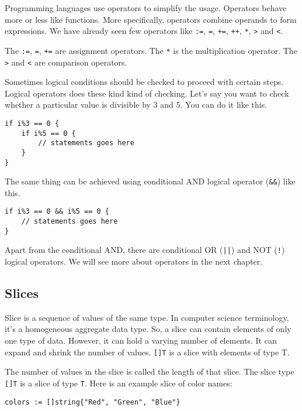 Programming languages use operators to simplify the
usage.  Operators behave more or less like functions.  More
specifically, operators combine operands to form expressions.  We have
already seen few operators
like \texttt{:=}, \texttt{=}, \texttt{+=}, \texttt{++}, \texttt{*},
\texttt{>} and \texttt{<}.

The \texttt{:=}, \texttt{=}, \texttt{+=} are assignment operators.
The \texttt{*} is the multiplication operator.  The \texttt{>}
and \texttt{<} are comparison operators.

Sometimes logical conditions should be checked to proceed with certain
steps.  Logical operators does these kind kind of checking.  Let's
say you want to check whether a particular value is divisible by 3
and 5.  You can do it like this.

\begin{lstlisting}[numbers=none]
if i%3 == 0 {
    if i%5 == 0 {
        // statements goes here
    }
}
\end{lstlisting}

The same thing can be achieved using conditional AND logical operator
(\texttt{\&\&}) like this.

\begin{lstlisting}[numbers=none]
if i%3 == 0 && i%5 == 0 {
    // statements goes here
}
\end{lstlisting}

Apart from the conditional AND, there are conditional OR (\texttt{||})
and NOT (\texttt{!}) logical operators.  We will see more about
operators in the next chapter.


\subsection{Slices}

Slice is a sequence of values of the same type.  In
computer science terminology, it's a homogeneous aggregate data type.
So, a slice can contain elements of only one type of data.  However,
it can hold a varying number of elements.  It can expand and shrink
the number of values.  \texttt{[]T} is a slice with elements of type
T.

The number of values in the slice is called the length of that slice.
The slice type \texttt{[]T} is a slice of type \texttt{T}.  Here is an
example slice of color names:

\begin{lstlisting}[numbers=none]
colors := []string{"Red", "Green", "Blue"}
\end{lstlisting}

